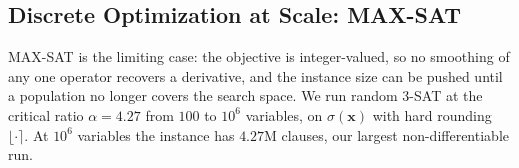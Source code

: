 \subsection{Discrete Optimization at Scale: MAX-SAT}\label{sec:maxsat}


MAX-SAT is the limiting case: the objective is integer-valued, so no smoothing of any
one operator recovers a derivative, and the instance size can be pushed until a
population no longer covers the search space. We run random 3-SAT at the critical ratio
$\alpha{=}4.27$ from $100$ to $10^6$ variables, on $\sigma(\mathbf{x})$ with hard
rounding $\lfloor\cdot\rceil$. At $10^6$ variables the instance has $4.27$M clauses,
our largest non-differentiable run.

